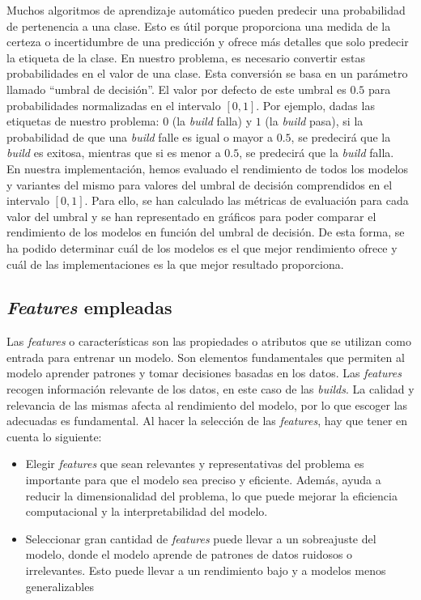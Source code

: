 Muchos algoritmos de aprendizaje automático pueden predecir una probabilidad de
pertenencia a una clase. Esto es útil porque proporciona una medida de la certeza o incertidumbre
de una predicción y ofrece más detalles que solo predecir la etiqueta de la clase. En nuestro
problema, es necesario convertir estas probabilidades en el valor de una clase. Esta conversión
se basa en un parámetro llamado ``umbral de decisión''. El valor por defecto de este umbral
es $0.5$ para probabilidades normalizadas en el intervalo $[0, 1]$. Por ejemplo, dadas las
etiquetas de nuestro problema: $0$ (la \textit{build} falla) y $1$ (la \textit{build} pasa), si
la probabilidad de que una \textit{build} falle es igual o mayor a $0.5$, se predecirá que la
\textit{build} es exitosa, mientras que si es menor a $0.5$, se predecirá que la \textit{build}
falla.\\

En nuestra implementación, hemos evaluado el rendimiento de todos los modelos y variantes del
mismo para valores del umbral de decisión comprendidos en el intervalo $[0, 1]$. Para ello, se
han calculado las métricas de evaluación para cada valor del umbral y se han representado en
gráficos para poder comparar el rendimiento de los modelos en función del umbral de decisión. De
esta forma, se ha podido determinar cuál de los modelos es el que mejor rendimiento ofrece y cuál
de las implementaciones es la que mejor resultado proporciona.


\subsection{\textit{Features} empleadas}\label{sec:features_used}
Las \textit{features} o características son las propiedades o atributos que se utilizan como entrada
para entrenar un modelo. Son elementos fundamentales que permiten al modelo aprender patrones y
tomar decisiones basadas en los datos. Las \textit{features} recogen información relevante de
los datos, en este caso de las \textit{builds}. La calidad y relevancia de las mismas afecta
al rendimiento del modelo, por lo que escoger las adecuadas es fundamental. Al hacer la selección
de las \textit{features}, hay que tener en cuenta lo siguiente:

\begin{itemize}
    \item Elegir \textit{features} que sean relevantes y representativas del problema es importante
    para que el modelo sea preciso y eficiente. Además, ayuda a reducir la dimensionalidad
    del problema, lo que puede mejorar la eficiencia computacional y la interpretabilidad del
    modelo.\\
    \item Seleccionar gran cantidad de \textit{features} puede llevar a un sobreajuste del modelo,
    donde el modelo aprende de patrones de datos ruidosos o irrelevantes. Esto puede llevar a un
    rendimiento bajo y a modelos menos generalizables
\end{itemize}

